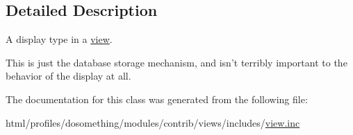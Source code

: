 \subsection{Detailed Description}
A display type in a \hyperlink{classview}{view}.

This is just the database storage mechanism, and isn't terribly important to the behavior of the display at all. 

The documentation for this class was generated from the following file:\begin{DoxyCompactItemize}
\item 
html/profiles/dosomething/modules/contrib/views/includes/\hyperlink{views_2includes_2view_8inc}{view.inc}\end{DoxyCompactItemize}
